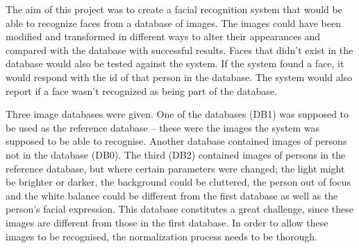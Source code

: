 The aim of this project was to create a facial recognition system that would be able to recognize faces from a database of images. The images could have been modified and transformed in different ways to alter their appearances and compared with the database with successful results. Faces that didn’t exist in the database would also be tested against the system. If the system found a face, it would respond with the id of that person in the database. The system would also report if a face wasn’t recognized as being part of the database. 

Three image databases were given. One of the databases (DB1) was supposed to be used as the reference database – these were the images the system was supposed to be able to recognise. Another database contained images of persons not in the database (DB0). The third (DB2) contained images of persons in the reference database, but where certain parameters were changed; the light might be brighter or darker, the background could be cluttered, the person out of focus and the white balance could be different from the first database as well as the person’s facial expression. This database constitutes a great challenge, since these images are different from those in the first database. In order to allow these images to be recognised, the normalization process needs to be thorough.